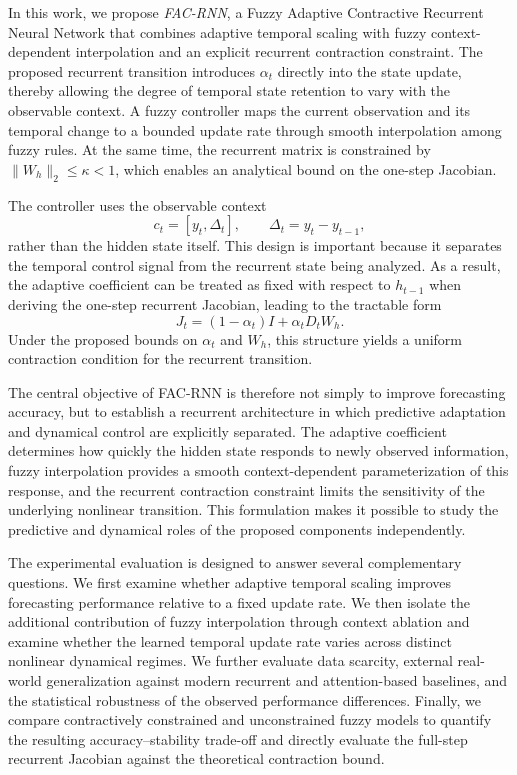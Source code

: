 \documentclass[journal]{IEEEtran}
\begin{document}
	In this work, we propose \emph{FAC-RNN}, a Fuzzy Adaptive Contractive Recurrent Neural Network that combines adaptive temporal scaling with fuzzy context-dependent interpolation and an explicit recurrent contraction constraint. The proposed recurrent transition introduces $\alpha_t$ directly into the state update, thereby allowing the degree of temporal state retention to vary with the observable context. A fuzzy controller maps the current observation and its temporal change to a bounded update rate through smooth interpolation among fuzzy rules. At the same time, the recurrent matrix is constrained by $\lVert W_h\rVert_2\leq\kappa<1$, which enables an analytical bound on the one-step Jacobian.
	
	The controller uses the observable context
	\begin{equation}
		c_t=[y_t,\Delta_t],
		\qquad
		\Delta_t=y_t-y_{t-1},
		\label{eq:intro_context}
	\end{equation}
	rather than the hidden state itself. This design is important because it separates the temporal control signal from the recurrent state being analyzed. As a result, the adaptive coefficient can be treated as fixed with respect to $h_{t-1}$ when deriving the one-step recurrent Jacobian, leading to the tractable form
	\begin{equation}
		J_t=(1-\alpha_t)I+\alpha_tD_tW_h.
		\label{eq:intro_jacobian}
	\end{equation}
	Under the proposed bounds on $\alpha_t$ and $W_h$, this structure yields a uniform contraction condition for the recurrent transition.
	
	The central objective of FAC-RNN is therefore not simply to improve forecasting accuracy, but to establish a recurrent architecture in which predictive adaptation and dynamical control are explicitly separated. The adaptive coefficient determines how quickly the hidden state responds to newly observed information, fuzzy interpolation provides a smooth context-dependent parameterization of this response, and the recurrent contraction constraint limits the sensitivity of the underlying nonlinear transition. This formulation makes it possible to study the predictive and dynamical roles of the proposed components independently.
	
	The experimental evaluation is designed to answer several complementary questions. We first examine whether adaptive temporal scaling improves forecasting performance relative to a fixed update rate. We then isolate the additional contribution of fuzzy interpolation through context ablation and examine whether the learned temporal update rate varies across distinct nonlinear dynamical regimes. We further evaluate data scarcity, external real-world generalization against modern recurrent and attention-based baselines, and the statistical robustness of the observed performance differences. Finally, we compare contractively constrained and unconstrained fuzzy models to quantify the resulting accuracy--stability trade-off and directly evaluate the full-step recurrent Jacobian against the theoretical contraction bound.
	
\end{document}
